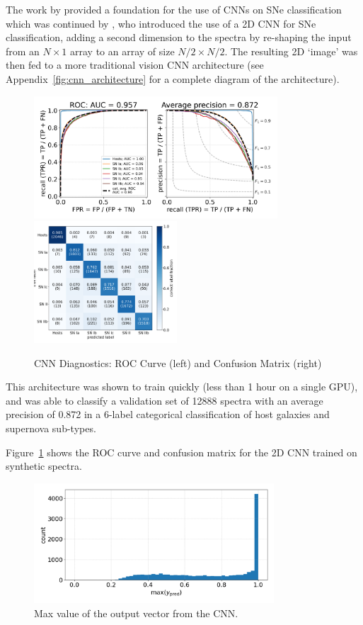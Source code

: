 The work by \textcite{wasserman2021} provided a foundation for the use of CNNs on SNe classification 
which was continued by \textcite{Sepeku2022}, who introduced the use of a
2D CNN for SNe classification, adding a second dimension to the spectra by
re-shaping the input from an $N\times1$ array to an array of size $N/2\times N/2$. 
The resulting 2D `image' was then fed to a more traditional vision 
CNN architecture (see Appendix~\ref{fig:cnn_architecture} for a complete diagram of the architecture). 
\begin{figure}[t]
    \centering
    \includegraphics[height=4.55cm]{figures/cnn/cnn_rocfull.png}
    \quad
    \includegraphics[height=4.55cm]{figures/cnn/cnn_cmfull.png}
    \caption[CNN diagnostics]{CNN Diagnostics: ROC Curve (left) and Confusion Matrix (right)\label{fig:cnn_qual}}
\end{figure}
This architecture was shown to train quickly (less than 1 hour on a single GPU), 
and was able to classify a validation set of 12888 spectra with an average precision of 0.872
in a 6-label categorical classification of host galaxies and supernova sub-types. 

Figure~\ref{fig:cnn_qual} shows the ROC curve and confusion matrix for the 
2D CNN trained on synthetic spectra. 
\begin{figure}[t!]
    \centering
    \includegraphics[width=0.8\textwidth]{figures/cnn/cnn_max_ypred.png}
    \caption[CNN's Confidence in Classification]{Max value of the output vector from the CNN.\label{fig:cnn_max}}
\end{figure}

